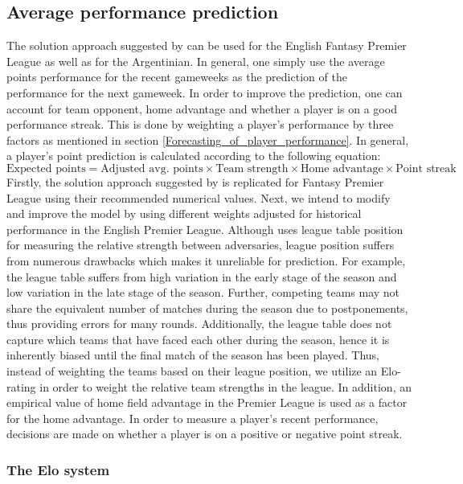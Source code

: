 \subsection{Average performance prediction}
The solution approach suggested by \cite{Bonomo} can be used for the English Fantasy Premier League as well as for the Argentinian. In general, one simply use the average points performance for the recent gameweeks as the prediction of the performance for the next gameweek. In order to improve the prediction, one can account for team opponent, home advantage and whether a player is on a good performance streak. This is done by weighting a player's performance by three factors as mentioned in section \ref{Forecasting_of_player_performance}.
\newpar
In general, a player's point prediction is calculated according to the following equation:
\begin{equation}
    \textrm{Expected points} = \textrm{Adjusted avg. points} \times \textrm{Team strength} \times \textrm{Home advantage} \times \textrm{Point streak}
\end{equation}
\newpar
Firstly, the solution approach suggested by \cite{Bonomo} is replicated for Fantasy Premier League using their recommended numerical values. Next, we intend to modify and improve the model by using different weights adjusted for historical performance in the English Premier League. Although \cite{Bonomo} uses league table position for measuring the relative strength between adversaries, league position suffers from numerous drawbacks which makes it unreliable for prediction. For example, the league table suffers from high variation in the early stage of the season and low variation in the late stage of the season. Further, competing teams may not share the equivalent number of matches during the season due to postponements, thus providing errors for many rounds. Additionally, the league table does not capture which teams that have faced each other during the season, hence it is inherently biased until the final match of the season has been played. Thus, instead of weighting the teams based on their league position, we utilize an Elo-rating in order to weight the relative team strengths in the league. In addition, an empirical value of home field advantage in the Premier League is used as a factor for the home advantage. In order to measure a player's recent performance, decisions are made on whether a player is on a positive or negative point streak. 
\subsubsection{The Elo system}

